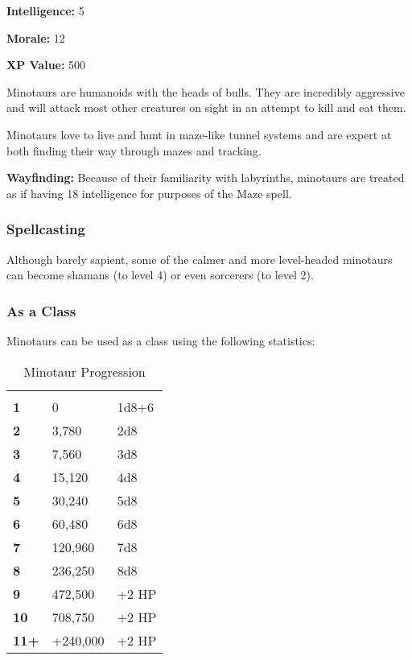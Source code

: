 \begin{multicols*}{2}
{{\textbf{Intelligence:} 5

\textbf{Morale:} 12

\textbf{XP Value:} 500}}

Minotaurs are humanoids with the heads of bulls. They are incredibly aggressive and will attack most other creatures on sight in an attempt to kill and eat them.

Minotaurs love to live and hunt in maze-like tunnel systems and are expert at both finding their way through mazes and tracking. 

\textbf{Wayfinding:} Because of their familiarity with labyrinths, minotaurs are treated as if having 18 intelligence for purposes of the Maze spell.

\subsubsection{Spellcasting}
Although barely sapient, some of the calmer and more level-headed minotaurs can become shamans (to level 4) or even sorcerers (to level 2).

\subsubsection{As a Class}
Minotaurs can be used as a class using the following statistics:


\begin {table}[H]
  \caption{Minotaur Progression}
  \begin{tabularx}{\columnwidth}{>{\bfseries}YYY}
   &  & \\
	1 & 0 & 1d8+6\\
	2 & 3,780 & 2d8\\
	3 & 7,560 & 3d8\\
	4 & 15,120 & 4d8\\
	5 & 30,240 & 5d8\\
	6 & 60,480 & 6d8\\
	7 & 120,960 & 7d8\\
	8 & 236,250 & 8d8\\
	9 & 472,500 & +2 HP\\
	10 & 708,750 & +2 HP\\
	11+ & +240,000 & +2 HP
  \end {tabularx}
\end {table}


\end{multicols*}
